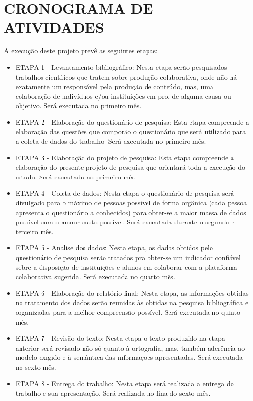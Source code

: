 
\chapter{CRONOGRAMA DE ATIVIDADES}
\label{chap:cronograma}

A execução deste projeto prevê as seguintes etapas:
\begin{itemize}
	\item ETAPA 1 - Levantamento bibliográfico: Nesta etapa serão pesquisados trabalhos científicos que tratem sobre produção colaborativa, onde não há exatamente um responsável pela produção de conteúdo, mas, uma colaboração de indivíduos e/ou instituições em prol de alguma causa ou objetivo. Será executada no primeiro mês.
	
	\item ETAPA 2 - Elaboração do questionário de pesquisa: Esta etapa compreende a elaboração das questões que comporão o questionário que será utilizado para a coleta de dados do trabalho. Será executada no primeiro mês.
	
	\item ETAPA 3 - Elaboração do projeto de pesquisa: Esta etapa compreende a elaboração do presente projeto de pesquisa que orientará toda a execução do estudo. Será executada no primeiro mês
	
	\item ETAPA 4 - Coleta de dados: Nesta etapa o questionário de pesquisa será divulgado para o máximo de pessoas possível de forma orgânica (cada pessoa apresenta o questionário a conhecidos) para obter-se a maior massa de dados possível com o menor custo possível. Será executada durante o segundo e terceiro mês.
	
	\item ETAPA 5 - Analise dos dados: Nesta etapa, os dados obtidos pelo questionário de pesquisa serão tratados pra obter-se um indicador confiável sobre a disposição de instituições e alunos em colaborar com a plataforma colaborativa sugerida. Será executada no quarto mês.
	
	\item ETAPA 6 - Elaboração do relatório final: Nesta etapa, as informações obtidas no tratamento dos dados serão reunidas às obtidas na pesquisa bibliográfica e organizadas para a melhor compreensão possível. Será executada no quinto mês.
	
	\item ETAPA 7 - Revisão do texto: Nesta etapa o texto produzido na etapa anterior será revisado não só quanto à ortografia, mas, também aderência ao modelo exigido e à semântica das informações apresentadas. Será executada no sexto mês.
	
	\item ETAPA 8 - Entrega do trabalho: Nesta etapa será realizada a entrega do trabalho e sua apresentação. Será realizada no fina do sexto mês.
\end{itemize}

